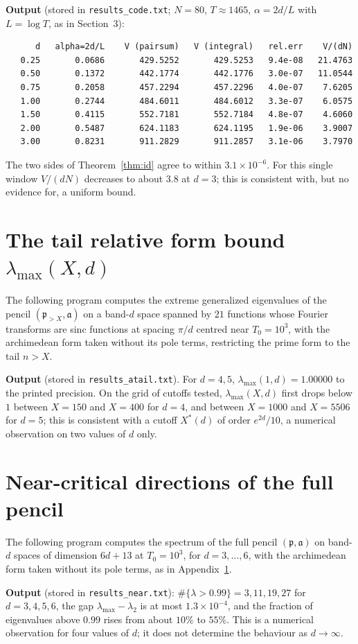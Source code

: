 \documentclass[11pt]{amsart}
\theoremstyle{definition}
\theoremstyle{remark}
\newcommand{\fa}{\mathfrak a}
\newcommand{\fp}{\mathfrak p}
\begin{document}


\medskip\noindent\textbf{Output} (stored in \texttt{results\_code.txt}; $N=80$,
$T\approx1465$, $\alpha=2d/L$ with $L=\log T$, as in Section~3):
\begin{lstlisting}
      d   alpha=2d/L    V (pairsum)   V (integral)   rel.err    V/(dN)
   0.25       0.0686       429.5252       429.5253   9.4e-08   21.4763
   0.50       0.1372       442.1774       442.1776   3.0e-07   11.0544
   0.75       0.2058       457.2294       457.2296   4.0e-07    7.6205
   1.00       0.2744       484.6011       484.6012   3.3e-07    6.0575
   1.50       0.4115       552.7181       552.7184   4.8e-07    4.6060
   2.00       0.5487       624.1183       624.1195   1.9e-06    3.9007
   3.00       0.8231       911.2829       911.2857   3.1e-06    3.7970
\end{lstlisting}
The two sides of Theorem~\ref{thm:id} agree to within $3.1\times10^{-6}$. For
this single window $V/(dN)$ decreases to about $3.8$ at $d=3$; this is
consistent with, but no evidence for, a uniform bound.

\section{The tail relative form bound \texorpdfstring{$\lambda_{\max}(X,d)$}{lambdamax}}\label{app:rfb}
The following program computes the extreme generalized eigenvalues of the pencil
$(\fp_{>X},\fa)$ on a band-$d$ space spanned by $21$ functions whose Fourier
transforms are sinc functions at spacing $\pi/d$ centred near $T_0=10^3$, with
the archimedean form taken without its pole terms, restricting the prime form to
the tail $n>X$.

\noindent\textbf{Output} (stored in \texttt{results\_atail.txt}). For $d=4,5$,
$\lambda_{\max}(1,d)=1.00000$ to the printed precision. On the grid of cutoffs
tested, $\lambda_{\max}(X,d)$ first drops below $1$ between $X=150$ and $X=400$
for $d=4$, and between $X=1000$ and $X=5506$ for $d=5$; this is consistent with a
cutoff $X^\ast(d)$ of order $e^{2d}/10$, a numerical observation on two values
of $d$ only.

\section{Near-critical directions of the full pencil}\label{app:near}
The following program computes the spectrum of the full pencil $(\fp,\fa)$ on
band-$d$ spaces of dimension $6d+13$ at $T_0=10^3$, for $d=3,\dots,6$, with the archimedean form taken without its pole terms, as in Appendix~\ref{app:rfb}.

\noindent\textbf{Output} (stored in \texttt{results\_near.txt}):
$\#\{\lambda>0.99\}=3,11,19,27$ for $d=3,4,5,6$, the gap
$\lambda_{\max}-\lambda_2$ is at most $1.3\times10^{-4}$, and the fraction of
eigenvalues above $0.99$ rises from about $10\%$ to $55\%$. This is a numerical
observation for four values of $d$; it does not determine the behaviour as
$d\to\infty$.
\end{document}
